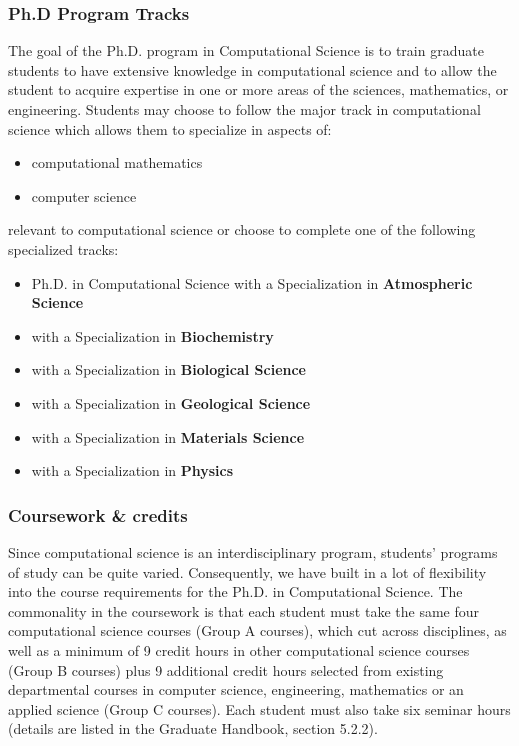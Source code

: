 \documentclass[12pt,a4paper]{article}
\begin{document}
\subsubsection*{Ph.D Program Tracks}
The goal of the Ph.D. program in Computational Science is to train graduate students to have extensive knowledge in computational science and to allow the student to acquire expertise in one or more areas of the sciences, mathematics, or engineering. Students may choose to follow the major track in computational science which allows them to specialize in aspects of:
\begin{itemize}
    \item computational mathematics
    \item computer science
\end{itemize}
relevant to computational science or choose to complete one of the following specialized tracks:
\begin{itemize}
    \item Ph.D. in Computational Science with a Specialization in \textbf{Atmospheric Science}
    \item with a Specialization in \textbf{Biochemistry}
    \item with a Specialization in \textbf{Biological Science}
    \item with a Specialization in \textbf{Geological Science}
    \item with a Specialization in \textbf{Materials Science}
    \item with a Specialization in \textbf{Physics}
\end{itemize}

\subsubsection*{Coursework \& credits}
Since computational science is an interdisciplinary program, students' programs of study can be quite varied. Consequently, we have built in a lot of flexibility into the course requirements for the Ph.D. in Computational Science. The commonality in the coursework is that each student must take the same four computational science courses (Group A courses), which cut across disciplines, as well as a minimum of 9 credit hours in other computational science courses (Group B courses) plus 9 additional credit hours selected from existing departmental courses in computer science, engineering, mathematics or an applied science (Group C courses). Each student must also take six seminar hours (details are listed in the Graduate Handbook, section 5.2.2).
\end{document}
